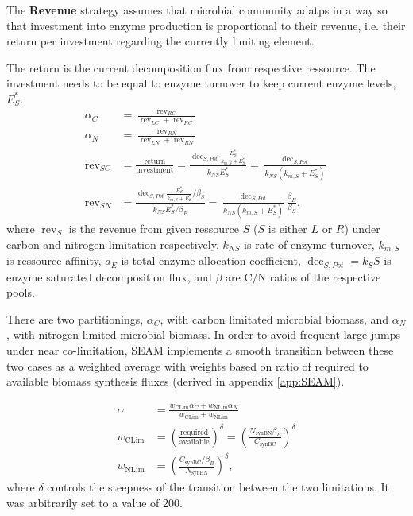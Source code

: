 The \textbf{Revenue} strategy assumes that microbial community adatps in a way
so that investment into enzyme production is proportional to their revenue, i.e.
their return per investment regarding the currently limiting element.

The return is the current decomposition flux from respective ressource. The
investment needs to be equal to enzyme turnover to keep current enzyme levels,
$E_S^*$.
% 
\begin{subequations}
\label{eq:allocRev}
\begin{align}
\alpha_C &= \frac{\operatorname{rev}_{RC}}{\operatorname{rev}_{LC} + \operatorname{rev}_{RC}} \\
\alpha_N &= \frac{\operatorname{rev}_{RN}}{\operatorname{rev}_{LN} + \operatorname{rev}_{RN}} \\
\operatorname{rev}_{SC} &= \frac{\text{return}}{\text{investment}} 
= \frac{\operatorname{dec}_{S,Pot} \frac{E_S^*}{k_{m,S} + E_S^*}} {k_{NS}E_S^*} 
= \frac{\operatorname{dec}_{S,Pot}} {k_{NS}(k_{m,S} + E_S^*)} \\ 
\operatorname{rev}_{SN} &= \frac{\operatorname{dec}_{S,Pot}
\frac{E_S^*}{k_{m,S} + E_S^*} / \beta_S} {k_{NS} E_S^* / \beta_E} 
= \frac{\operatorname{dec}_{S,Pot}}{k_{NS} (k_{m,S} + E_S^*)}
\frac{\beta_E}{\beta_S}
\text{,} 
\end{align}
\end{subequations}
where $\operatorname{rev}_S$ is the revenue from given ressource $S$ ($S$ is either $L$ or $R$)
under carbon and nitrogen limitation respectively.
$k_{NS}$ is rate of enzyme turnover, $k_{m,S}$ is ressource affinity, $a_E$ is
total enzyme allocation coefficient, $\operatorname{dec}_{S,Pot} = k_S S$ is
enzyme saturated decomposition flux, and $\beta$ are C/N ratios of the
respective pools.

There are two partitionings, $\alpha_C$, with carbon limitated microbial
biomass, and $\alpha_N$, with nitrogen limited microbial biomass. In order to
avoid frequent large jumps under near co-limitation, SEAM implements a smooth
transition between these two cases as a weighted average with weights based
on ratio of required to available biomass synthesis fluxes (derived in
appendix \ref{app:SEAM}).

\begin{subequations}
\label{eq:allocRev}
\begin{align}
\alpha &= \frac{w_{\operatorname{CLim}} \alpha_C + w_{\operatorname{NLim}}
\alpha_N}{w_{\operatorname{CLim}}  + w_{\operatorname{NLim}} } 
\\
w_{\operatorname{CLim}} &= \left( \frac{\text{required}}{\text{available}}
\right)^\delta 
= \left( \frac{ N_{\operatorname{synBN}} \beta_B }{ C_{\operatorname{synBC}} }
\right)^\delta
\\
w_{\operatorname{NLim}} &= \left( \frac{ C_{\operatorname{synBC}} / \beta_B }{
N_{\operatorname{synBN}} } \right)^\delta
\text{,} 
\end{align}
\end{subequations}
where $\delta$ controls the steepness of the transition between the two
limitations. It was arbitrarily set to a value of 200.


